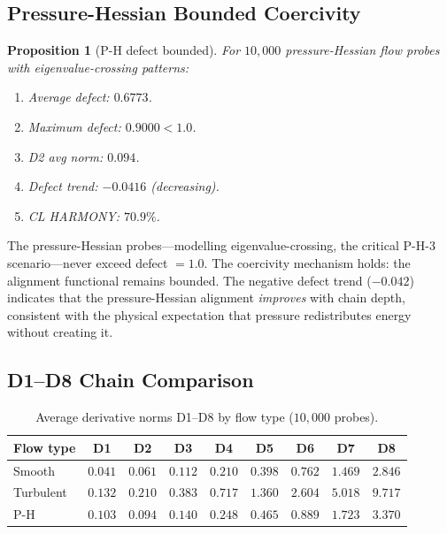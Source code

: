 \documentclass[11pt]{article}
\newtheorem{proposition}[theorem]{Proposition}
\theoremstyle{definition}
\theoremstyle{remark}
\begin{document}
\subsection{Pressure-Hessian Bounded Coercivity}
\label{ssec:ph3-bounded}

\begin{proposition}[P-H defect bounded]
\label{prop:ph-bounded}
For $10{,}000$ pressure-Hessian flow probes with eigenvalue-crossing patterns:
\begin{enumerate}
  \item Average defect: $0.6773$.
  \item Maximum defect: $0.9000 < 1.0$.
  \item D2 avg norm: $0.094$.
  \item Defect trend: $-0.0416$ (decreasing).
  \item CL HARMONY: $70.9\%$.
\end{enumerate}
\end{proposition}

\noindent
The pressure-Hessian probes---modelling eigenvalue-crossing, the critical
P-H-3 scenario---never exceed defect $= 1.0$.  The coercivity mechanism
holds: the alignment functional remains bounded.  The negative defect trend
($-0.042$) indicates that the pressure-Hessian alignment \emph{improves} with
chain depth, consistent with the physical expectation that pressure
redistributes energy without creating it.

\subsection{D1--D8 Chain Comparison}
\label{ssec:ph3-chain}

\begin{table}[ht]
\centering
\caption{Average derivative norms D1--D8 by flow type ($10{,}000$ probes).}
\label{tab:chain}
\begin{tabular}{lcccccccc}
\toprule
\textbf{Flow type} & \textbf{D1} & \textbf{D2} & \textbf{D3} & \textbf{D4}
  & \textbf{D5} & \textbf{D6} & \textbf{D7} & \textbf{D8} \\
\midrule
Smooth    & $0.041$ & $0.061$ & $0.112$ & $0.210$ & $0.398$ & $0.762$ & $1.469$ & $2.846$ \\
Turbulent & $0.132$ & $0.210$ & $0.383$ & $0.717$ & $1.360$ & $2.604$ & $5.018$ & $9.717$ \\
P-H       & $0.103$ & $0.094$ & $0.140$ & $0.248$ & $0.465$ & $0.889$ & $1.723$ & $3.370$ \\
\bottomrule
\end{tabular}
\end{table}
\end{document}
